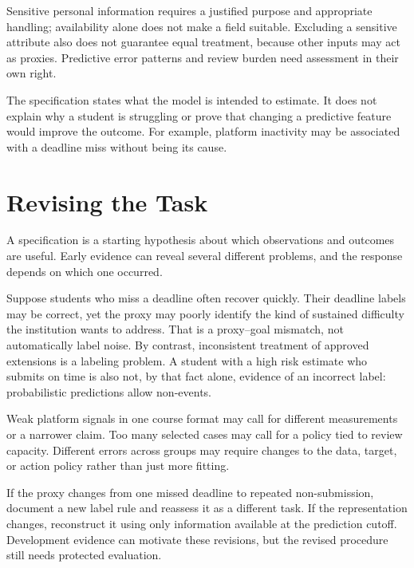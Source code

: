 Sensitive personal information requires a justified purpose and appropriate handling; availability alone does not make a field suitable. Excluding a sensitive attribute also does not guarantee equal treatment, because other inputs may act as proxies. Predictive error patterns and review burden need assessment in their own right.

The specification states what the model is intended to estimate. It does not explain why a student is struggling or prove that changing a predictive feature would improve the outcome. For example, platform inactivity may be associated with a deadline miss without being its cause.

\section{Revising the Task}

A specification is a starting hypothesis about which observations and outcomes are useful. Early evidence can reveal several different problems, and the response depends on which one occurred.

Suppose students who miss a deadline often recover quickly. Their deadline labels may be correct, yet the proxy may poorly identify the kind of sustained difficulty the institution wants to address. That is a proxy--goal mismatch, not automatically label noise. By contrast, inconsistent treatment of approved extensions is a labeling problem. A student with a high risk estimate who submits on time is also not, by that fact alone, evidence of an incorrect label: probabilistic predictions allow non-events.

Weak platform signals in one course format may call for different measurements or a narrower claim. Too many selected cases may call for a policy tied to review capacity. Different errors across groups may require changes to the data, target, or action policy rather than just more fitting.

If the proxy changes from one missed deadline to repeated non-submission, document a new label rule and reassess it as a different task. If the representation changes, reconstruct it using only information available at the prediction cutoff. Development evidence can motivate these revisions, but the revised procedure still needs protected evaluation.

